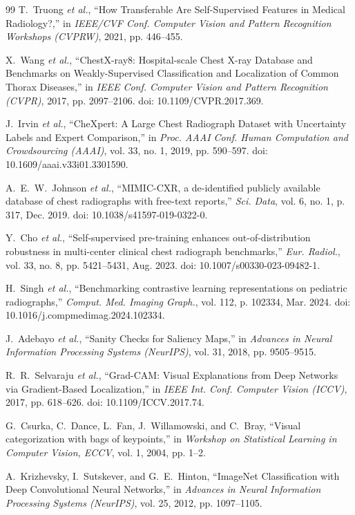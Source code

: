 \documentclass[journal,article,submit,moreauthors,pdftex]{Definitions/tsp}
\begin{document}
\begin{thebibliography}{99}
T.~Truong \emph{et al.}, ``How Transferable Are Self-Supervised Features in Medical Radiology?,'' in \emph{IEEE/CVF Conf. Computer Vision and Pattern Recognition Workshops (CVPRW)}, 2021, pp. 446--455.

X.~Wang \emph{et al.}, ``ChestX-ray8: Hospital-scale Chest X-ray Database and Benchmarks on Weakly-Supervised Classification and Localization of Common Thorax Diseases,'' in \emph{IEEE Conf. Computer Vision and Pattern Recognition (CVPR)}, 2017, pp. 2097--2106. doi: 10.1109/CVPR.2017.369.

J.~Irvin \emph{et al.}, ``CheXpert: A Large Chest Radiograph Dataset with Uncertainty Labels and Expert Comparison,'' in \emph{Proc. AAAI Conf. Human Computation and Crowdsourcing (AAAI)}, vol. 33, no. 1, 2019, pp. 590--597. doi: 10.1609/aaai.v33i01.3301590.

A.~E.~W.~Johnson \emph{et al.}, ``MIMIC-CXR, a de-identified publicly available database of chest radiographs with free-text reports,'' \emph{Sci. Data}, vol. 6, no. 1, p. 317, Dec. 2019. doi: 10.1038/s41597-019-0322-0.

Y.~Cho \emph{et al.}, ``Self-supervised pre-training enhances out-of-distribution robustness in multi-center clinical chest radiograph benchmarks,'' \emph{Eur. Radiol.}, vol. 33, no. 8, pp. 5421--5431, Aug. 2023. doi: 10.1007/s00330-023-09482-1.

H.~Singh \emph{et al.}, ``Benchmarking contrastive learning representations on pediatric radiographs,'' \emph{Comput. Med. Imaging Graph.}, vol. 112, p. 102334, Mar. 2024. doi: 10.1016/j.compmedimag.2024.102334.

J.~Adebayo \emph{et al.}, ``Sanity Checks for Saliency Maps,'' in \emph{Advances in Neural Information Processing Systems (NeurIPS)}, vol. 31, 2018, pp. 9505--9515.

R.~R.~Selvaraju \emph{et al.}, ``Grad-CAM: Visual Explanations from Deep Networks via Gradient-Based Localization,'' in \emph{IEEE Int. Conf. Computer Vision (ICCV)}, 2017, pp. 618--626. doi: 10.1109/ICCV.2017.74.

G.~Csurka, C.~Dance, L.~Fan, J.~Willamowski, and C.~Bray, ``Visual categorization with bags of keypoints,'' in \emph{Workshop on Statistical Learning in Computer Vision, ECCV}, vol. 1, 2004, pp. 1--2.

A.~Krizhevsky, I.~Sutskever, and G.~E.~Hinton, ``ImageNet Classification with Deep Convolutional Neural Networks,'' in \emph{Advances in Neural Information Processing Systems (NeurIPS)}, vol. 25, 2012, pp. 1097--1105.


\end{thebibliography}
\end{document}
